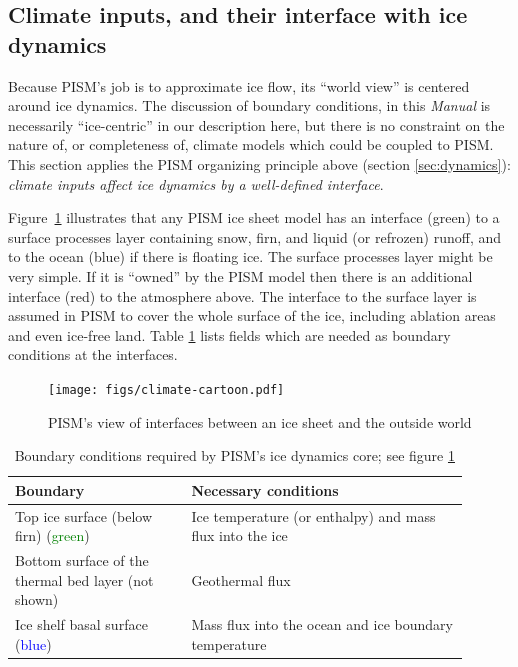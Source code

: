 \documentclass[titlepage,letterpaper,final]{scrartcl}
\begin{document}
\subsection{Climate inputs, and their interface with ice dynamics}
\label{sec:climate-inputs}  

Because PISM's job is to approximate ice flow, its ``world view'' is centered around ice dynamics.  The discussion of boundary conditions, in this \emph{Manual} is necessarily ``ice-centric'' in our description here, but there is no constraint on the nature of, or completeness of, climate models which could be coupled to PISM.  This section applies the PISM organizing principle above (section \ref{sec:dynamics}): \emph{climate inputs affect ice dynamics by a well-defined interface}.

Figure~\ref{fig:climate-inputs} illustrates that any PISM ice sheet model has an interface (green) to a surface processes layer containing snow, firn, and liquid (or refrozen) runoff, and to the ocean (blue) if there is floating ice.  The surface processes layer might be very simple.  If it is ``owned'' by the PISM model then there is an additional interface (red) to the atmosphere above.  The interface to the surface layer is assumed in PISM to cover the whole surface of the ice, including ablation areas and even ice-free land.  Table \ref{tab:ice-dynamics-bc} lists fields which are needed as boundary conditions at the interfaces.

\begin{figure}
  \centering
  \texttt{[image: figs/climate-cartoon.pdf]}
  \caption{PISM's view of interfaces between an ice sheet and the outside world}
  \label{fig:climate-inputs}
\end{figure}

\begin{table}[h]
  \centering
 \begin{tabular}{p{0.35\linewidth}p{0.55\linewidth}}
    \toprule
    \textbf{Boundary} & \textbf{Necessary conditions}\\
    \midrule
    Top ice surface (below firn) (\textcolor{green}{green})& Ice temperature (or enthalpy) and mass flux into the ice\\
    Bottom surface of the thermal bed layer (not shown) & Geothermal flux\\
    Ice shelf basal surface (\textcolor{blue}{blue})& Mass flux into the ocean and ice boundary temperature\\
   \bottomrule
  \end{tabular}
\caption{Boundary conditions required by PISM's ice dynamics core; see figure \ref{fig:climate-inputs}}
\label{tab:ice-dynamics-bc}
\end{table}
\end{document}
